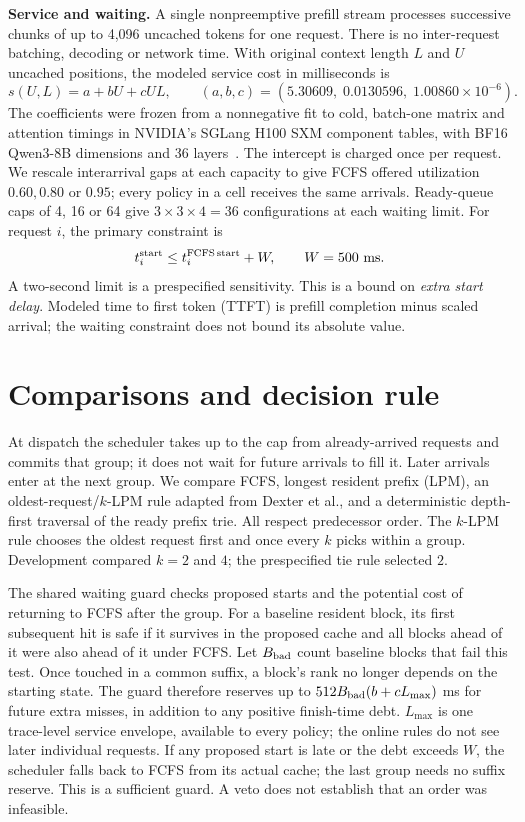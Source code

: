 \documentclass[11pt,letterpaper]{article}
\begin{document}
\textbf{Service and waiting.} A single nonpreemptive prefill stream processes successive chunks of up to 4,096 uncached tokens for one request. There is no inter-request batching, decoding or network time. With original context length \(L\) and \(U\) uncached positions, the modeled service cost in milliseconds is
\[
       s(U,L)=a+bU+cUL,\qquad
       (a,b,c)=(5.30609,\;0.0130596,\;1.00860\times10^{-6}).
\]
The coefficients were frozen from a nonnegative fit to cold, batch-one matrix and attention timings in NVIDIA's SGLang H100 SXM component tables, with BF16 Qwen3-8B dimensions and 36 layers~\cite{nvidia,model}. The intercept is charged once per request. We rescale interarrival gaps at each capacity to give FCFS offered utilization \(0.60,0.80\) or \(0.95\); every policy in a cell receives the same arrivals. Ready-queue caps of 4, 16 or 64 give \(3\times3\times4=36\) configurations at each waiting limit. For request \(i\), the primary constraint is
\[
       t_i^{\rm start}\le t_i^{\rm FCFS\,start}+W,\qquad W=500\ {\rm ms}.
\]
A two-second limit is a prespecified sensitivity. This is a bound on \emph{extra start delay}. Modeled time to first token (TTFT) is prefill completion minus scaled arrival; the waiting constraint does not bound its absolute value.

\section{Comparisons and decision rule}
At dispatch the scheduler takes up to the cap from already-arrived requests and commits that group; it does not wait for future arrivals to fill it. Later arrivals enter at the next group. We compare FCFS, longest resident prefix (LPM), an oldest-request/\(k\)-LPM rule adapted from Dexter et al., and a deterministic depth-first traversal of the ready prefix trie. All respect predecessor order. The \(k\)-LPM rule chooses the oldest request first and once every \(k\) picks within a group. Development compared \(k=2\) and \(4\); the prespecified tie rule selected \(2\).

The shared waiting guard checks proposed starts and the potential cost of returning to FCFS after the group. For a baseline resident block, its first subsequent hit is safe if it survives in the proposed cache and all blocks ahead of it were also ahead of it under FCFS. Let \(B_{\rm bad}\) count baseline blocks that fail this test. Once touched in a common suffix, a block's rank no longer depends on the starting state. The guard therefore reserves up to \(512 B_{\rm bad}(b+cL_{\max})\) ms for future extra misses, in addition to any positive finish-time debt. \(L_{\max}\) is one trace-level service envelope, available to every policy; the online rules do not see later individual requests. If any proposed start is late or the debt exceeds \(W\), the scheduler falls back to FCFS from its actual cache; the last group needs no suffix reserve. This is a sufficient guard. A veto does not establish that an order was infeasible.
\end{document}
